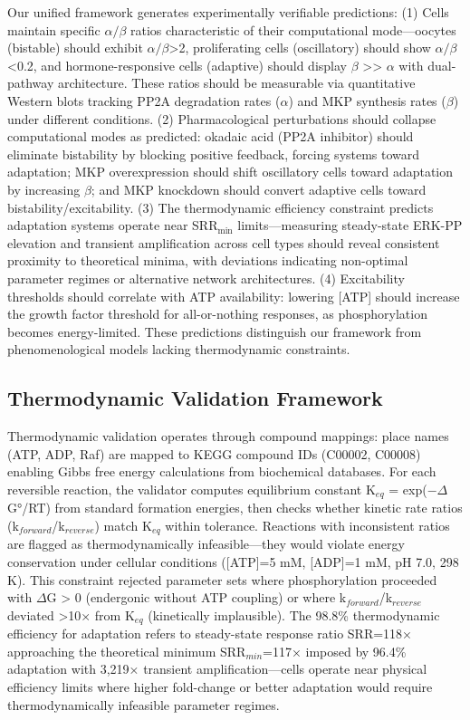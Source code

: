 \documentclass[twocolumn,11pt]{article}
\begin{document}
Our unified framework generates experimentally verifiable predictions: (1) Cells maintain specific $\alpha/\beta$ ratios characteristic of their computational mode—oocytes (bistable) should exhibit $\alpha/\beta$>2, proliferating cells (oscillatory) should show $\alpha/\beta$<0.2, and hormone-responsive cells (adaptive) should display $\beta$ >> $\alpha$ with dual-pathway architecture. These ratios should be measurable via quantitative Western blots tracking PP2A degradation rates ($\alpha$) and MKP synthesis rates ($\beta$) under different conditions. (2) Pharmacological perturbations should collapse computational modes as predicted: okadaic acid (PP2A inhibitor) should eliminate bistability by blocking positive feedback, forcing systems toward adaptation; MKP overexpression should shift oscillatory cells toward adaptation by increasing $\beta$; and MKP knockdown should convert adaptive cells toward bistability/excitability. (3) The thermodynamic efficiency constraint predicts adaptation systems operate near SRR$_{\text{min}}$ limits—measuring steady-state ERK-PP elevation and transient amplification across cell types should reveal consistent proximity to theoretical minima, with deviations indicating non-optimal parameter regimes or alternative network architectures. (4) Excitability thresholds should correlate with ATP availability: lowering [ATP] should increase the growth factor threshold for all-or-nothing responses, as phosphorylation becomes energy-limited. These predictions distinguish our framework from phenomenological models lacking thermodynamic constraints.

\subsection*{Thermodynamic Validation Framework}

Thermodynamic validation operates through compound mappings: place names (ATP, ADP, Raf) are mapped to KEGG compound IDs (C00002, C00008) enabling Gibbs free energy calculations from biochemical databases. For each reversible reaction, the validator computes equilibrium constant K$_{eq}$ = exp($-\Delta$G°/RT) from standard formation energies, then checks whether kinetic rate ratios (k$_{forward}$/k$_{reverse}$) match K$_{eq}$ within tolerance. Reactions with inconsistent ratios are flagged as thermodynamically infeasible—they would violate energy conservation under cellular conditions ([ATP]=5 mM, [ADP]=1 mM, pH 7.0, 298 K). This constraint rejected parameter sets where phosphorylation proceeded with $\Delta$G > 0 (endergonic without ATP coupling) or where k$_{forward}$/k$_{reverse}$ deviated >10× from K$_{eq}$ (kinetically implausible). The 98.8\% thermodynamic efficiency for adaptation refers to steady-state response ratio SRR=118× approaching the theoretical minimum SRR$_{min}$=117× imposed by 96.4\% adaptation with 3,219× transient amplification—cells operate near physical efficiency limits where higher fold-change or better adaptation would require thermodynamically infeasible parameter regimes.
\end{document}
